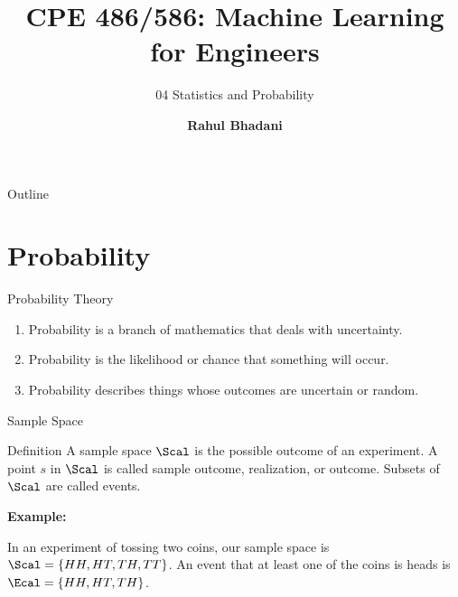 \documentclass[aspectratio=169,xcolor=dvipsnames,svgnames,x11names,fleqn]{beamer}
\title[CPE 486/586: Machine Learning]{CPE 486/586: Machine Learning for Engineers} %
\subtitle{04 Statistics and Probability}
\author[Rahul Bhadani] {{\Large \textbf{Rahul Bhadani}}}
\institute[UAH] %
{
    Electrical \& Computer Engineering,  The University of Alabama in Huntsville
}
\date
\begin{document}
\begin{frame}
    \titlepage
\end{frame}

\begin{frame}{Outline}
    \backgroundtableofcontents
\end{frame}

\section{Probability}

\begin{frame}
    \sectionpage
\end{frame}





\begin{frame}[containsverbatim]{Probability Theory}
    \begin{enumerate}
        \item Probability is a branch of mathematics that deals with uncertainty.
        \item Probability is the likelihood or chance that something will occur. 
        \item Probability describes things whose outcomes are uncertain or random.
        
    \end{enumerate}
    \end{frame}
    
    
    \begin{frame}[containsverbatim]{Sample Space}
    \begin{tblock}{Definition}
        A sample space $\Scal$ is the possible outcome of an experiment. A point $s$ in $\Scal$ is called sample outcome, realization, or outcome. Subsets of $\Scal$ are called events. 
        
        \textbf{Example: }
    
        In an experiment of tossing two coins, our sample space is $\Scal = \{HH, HT, TH, TT\}$. An event that at least one of the coins is heads is $\Ecal = \{HH, HT, TH\}$.
    \end{tblock}
    \end{frame}
    
    
\end{document}
